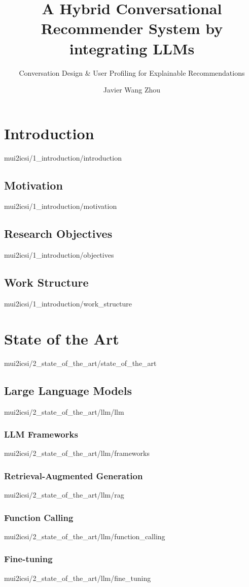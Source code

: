 \documentclass[english,epsbased,copyright,final,printable,covers,extendedindex,firstnumbered,tfm,gnuplot,loc,loe,lof,lot]{tfgtfmthesisuam}
\title{A Hybrid Conversational Recommender System by integrating LLMs}
\subtitle{Conversation Design \& User Profiling for Explainable Recommendations}
\author{Javier Wang Zhou}
\begin{document}
  \chapter{Introduction\label{CAP:INTRODUCTION}}{mui2icsi/1_introduction/introduction}
    \section{Motivation\label{SEC:MOTIVATION}}{mui2icsi/1_introduction/motivation}
    \section{Research Objectives\label{SEC:OBJECTIVES}}{mui2icsi/1_introduction/objectives}
    \section{Work Structure\label{SEC:WORK_STRUCT}}{mui2icsi/1_introduction/work_structure}

  \chapter{State of the Art\label{CAP:STATE_OF_THE_ART}}{mui2icsi/2_state_of_the_art/state_of_the_art}
    \section{Large Language Models\label{SEC:LLM}}{mui2icsi/2_state_of_the_art/llm/llm}
      \subsection{LLM Frameworks\label{SS:LLMFRAMEWORKS}}{mui2icsi/2_state_of_the_art/llm/frameworks}
      \subsection{Retrieval-Augmented Generation\label{SS:RAG}}{mui2icsi/2_state_of_the_art/llm/rag}
      \subsection{Function Calling\label{SS:FUNCTION_CALLING}}{mui2icsi/2_state_of_the_art/llm/function_calling}
      \subsection{Fine-tuning\label{SS:FINE_TUNING}}{mui2icsi/2_state_of_the_art/llm/fine_tuning}
\end{document}
